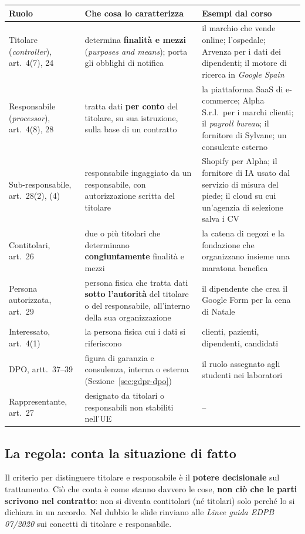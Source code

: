\begingroup\small
\begin{longtable}{>{\raggedright\arraybackslash}p{2.6cm} >{\raggedright\arraybackslash}p{5.3cm} >{\raggedright\arraybackslash}p{6.2cm}}
\toprule
\textbf{Ruolo} & \textbf{Che cosa lo caratterizza} & \textbf{Esempi dal corso}\\
\midrule
\endhead
Titolare (\emph{controller}), art.~4(7), 24 & determina \textbf{finalità e mezzi} (\emph{purposes and
  means}); porta gli obblighi di notifica & il marchio che vende online; l'ospedale; Arvenza per i dati
  dei dipendenti; il motore di ricerca in \emph{Google Spain}\\
Responsabile (\emph{processor}), art.~4(8), 28 & tratta dati \textbf{per conto} del titolare, su sua
  istruzione, sulla base di un contratto & la piattaforma SaaS di e-commerce; Alpha S.r.l.\ per i marchi
  clienti; il \emph{payroll bureau}; il fornitore di Sylvane; un consulente esterno\\
Sub-responsabile, art.~28(2), (4) & responsabile ingaggiato da un responsabile, con autorizzazione
  scritta del titolare & Shopify per Alpha; il fornitore di IA usato dal servizio di misura del piede;
  il cloud su cui un'agenzia di selezione salva i CV\\
Contitolari, art.~26 & due o più titolari che determinano \textbf{congiuntamente} finalità e mezzi & la
  catena di negozi e la fondazione che organizzano insieme una maratona benefica\\
Persona autorizzata, art.~29 & persona fisica che tratta dati \textbf{sotto l'autorità} del titolare o
  del responsabile, all'interno della sua organizzazione & il dipendente che crea il Google Form per la
  cena di Natale\\
Interessato, art.~4(1) & la persona fisica cui i dati si riferiscono & clienti, pazienti, dipendenti,
  candidati\\
DPO, artt.~37--39 & figura di garanzia e consulenza, interna o esterna (Sezione~\ref{sec:gdpr-dpo}) & il
  ruolo assegnato agli studenti nei laboratori\\
Rappresentante, art.~27 & designato da titolari o responsabili non stabiliti nell'UE & --\\
\bottomrule
\end{longtable}
\endgroup

\subsection{La regola: conta la situazione di fatto}
Il criterio per distinguere titolare e responsabile è il \textbf{potere decisionale} sul trattamento.
Ciò che conta è come stanno davvero le cose, \textbf{non ciò che le parti scrivono nel contratto}: non si
diventa contitolari (né titolari) solo perché lo si dichiara in un accordo. Nel dubbio le slide
rinviano alle \emph{Linee guida EDPB 07/2020} sui concetti di titolare e responsabile.

